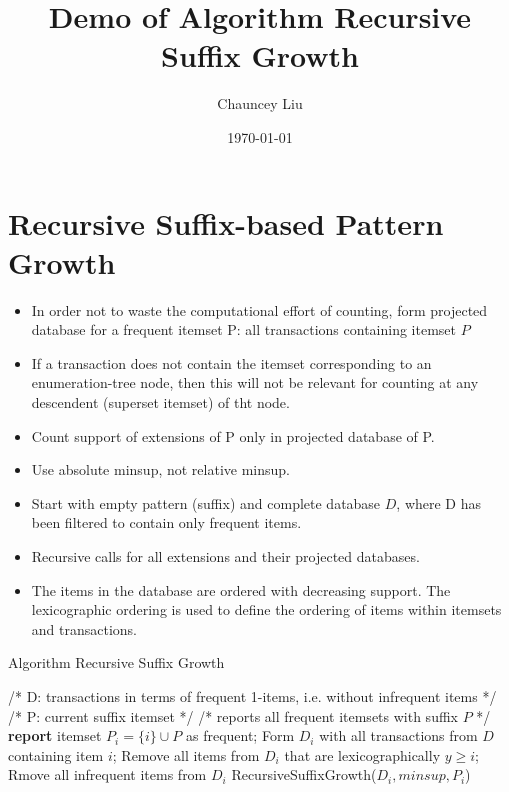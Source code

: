 \documentclass[12pt]{article}
\title{\huge{\textbf{Demo of Algorithm Recursive Suffix Growth}}}
\author{Chauncey Liu}
\date{\today}
\begin{document}
 
\maketitle

\section{Recursive Suffix-based Pattern Growth}
\begin{itemize}
\item In order not to waste the computational effort of counting, form projected database for a frequent itemset P: all transactions containing itemset $P$
\item If a transaction does not contain the itemset corresponding to an enumeration-tree node, then this will not be relevant for counting at any descendent (superset itemset) of tht node.
\item Count support of extensions of P only in projected database of P.
\item Use absolute minsup, not relative minsup.
\item Start with empty pattern (suffix) and complete database $D$, where D has been filtered to contain only frequent items.
\item Recursive calls for all extensions and their projected databases.
\item The items in the database are ordered with decreasing support. The lexicographic ordering is used to define the ordering of items within itemsets and transactions. 
\end{itemize}

\begin{algorithm}
\caption{Algorithm Recursive Suffix Growth}
\begin{algorithmic}[0]
\State /* D: transactions in terms of frequent 1-items, i.e. without infrequent items */
\State /* P: current suffix itemset */
\State /* reports all frequent itemsets with suffix $P$ */ \\

  \State \textbf{report} itemset $P_i = \{i\} \cup P$  as frequent;
  \State Form $D_i$ with all transactions from $D$ containing item $i$;
  \State Remove all items from $D_i$ that are lexicographically $y \ge i$;
  \State Rmove all infrequent items from $D_i$
    RecursiveSuffixGrowth($D_i, minsup, P_i$)
  \EndIf
\EndFor
\EndFunction
\end{algorithmic}
\end{algorithm}
\end{document}
